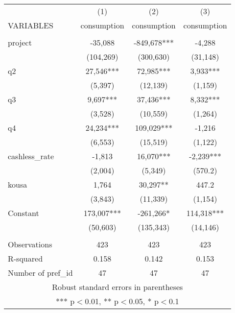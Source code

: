 \documentclass[]{article}
\begin{document}
\begin{tabular}{lccc} \hline
 & (1) & (2) & (3) \\
VARIABLES & consumption & consumption & consumption \\ \hline
 &  &  &  \\
project & -35,088 & -849,678*** & -4,288 \\
 & (104,269) & (300,630) & (31,148) \\
q2 & 27,546*** & 72,985*** & 3,933*** \\
 & (5,397) & (12,139) & (1,159) \\
q3 & 9,697*** & 37,436*** & 8,332*** \\
 & (3,528) & (10,559) & (1,264) \\
q4 & 24,234*** & 109,029*** & -1,216 \\
 & (6,553) & (15,519) & (1,122) \\
cashless\_rate & -1,813 & 16,070*** & -2,239*** \\
 & (2,004) & (5,349) & (570.2) \\
kousa & 1,764 & 30,297** & 447.2 \\
 & (3,843) & (11,339) & (1,154) \\
Constant & 173,007*** & -261,266* & 114,318*** \\
 & (50,603) & (135,343) & (14,146) \\
 &  &  &  \\
Observations & 423 & 423 & 423 \\
R-squared & 0.158 & 0.142 & 0.153 \\
 Number of pref\_id & 47 & 47 & 47 \\ \hline
\multicolumn{4}{c}{ Robust standard errors in parentheses} \\
\multicolumn{4}{c}{ *** p$<$0.01, ** p$<$0.05, * p$<$0.1} \\
\end{tabular}
\end{document}
